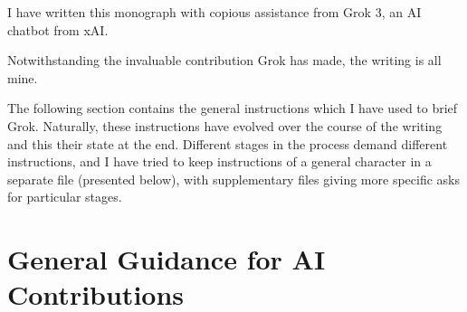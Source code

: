 \documentclass[10pt,titlepage]{book}
\begin{document}
I have written this monograph with copious assistance from Grok 3, an AI chatbot from xAI.

Notwithstanding the invaluable contribution Grok has made, the writing is all mine.

The following section contains the general instructions which I have used to brief Grok.
Naturally, these instructions have evolved over the course of the writing and this their state at the end.
Different stages in the process demand different instructions, and I have tried to keep instructions of a general character  in a separate file (presented below), with supplementary files giving more specific asks for particular stages.

\section{General Guidance for AI Contributions}





\listoftables

{}



\renewcommand{\indexname}{Index of Defined Terms}
{\twocolumn[]
{\small\printindex}}


\end{document}

